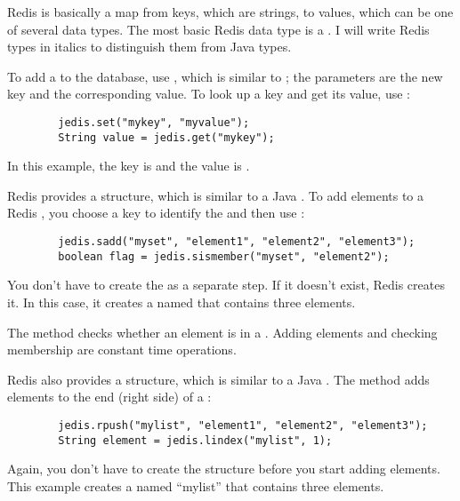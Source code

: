 \documentclass[12pt]{book}
\theoremstyle{exercise}
\begin{document}
Redis is basically a map from keys, which are strings, to
values, which can be one of several data types. The most basic Redis
data type is a .  I will write Redis types in
italics to distinguish them from Java types. 

To add a  to the database,
use , which is similar to ; the
parameters are the new key and the corresponding value. To look up a
key and get its value, use :

\begin{verbatim}
        jedis.set("mykey", "myvalue");
        String value = jedis.get("mykey");
\end{verbatim}

In this example, the key is  and the value is
.


Redis provides a  structure, which is
similar to a Java
. To add elements to a Redis ,
you choose a key to identify the  and then use
:

\begin{verbatim}
        jedis.sadd("myset", "element1", "element2", "element3");
        boolean flag = jedis.sismember("myset", "element2");
\end{verbatim}

You don't have to create the  as a separate step. If it doesn't
exist, Redis creates it. In this case, it creates a  named
 that contains three elements.

The method  checks whether an element is in a
. Adding elements and checking membership are constant time
operations.


Redis also provides a  structure, which is
similar to a Java
. The method
 adds elements to the end (right side) of a
:

\begin{verbatim}
        jedis.rpush("mylist", "element1", "element2", "element3");
        String element = jedis.lindex("mylist", 1);
\end{verbatim}

Again, you don't have to create the structure before you start
adding elements. This example creates a  named ``mylist'' that
contains three elements.
\end{document}
